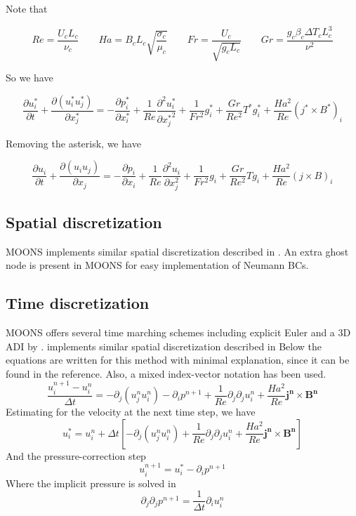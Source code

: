 \documentclass[11pt]{article}
\begin{document}
Note that

\begin{equation}
	Re = \frac{U_c L_c}{\nu_c} \qquad
	Ha = B_c L_c \sqrt{\frac{\sigma_c}{\mu_c}} \qquad
	Fr = \frac{U_c}{\sqrt{g_c L_c}} \qquad
	Gr = \frac{g_c \beta_c \Delta T_c L_c^3}{\nu^2}
\end{equation}

So we have

\begin{equation}
	\frac{\partial u_i^*}{\partial t} + 
	\frac{\partial (u_i^* u_j^*)}{\partial x_j^*}
	= 
	- \frac{\partial p_i^*}{\partial x_i^*}
	+ \frac{1}{Re}
	\frac{\partial^2 u_i^*}{\partial {x_j^*}^2}
	+ \frac{1}{Fr^2}
	g_i^*
	+ \frac{Gr}{Re^2}
	T^*g_i^*
	+ \frac{Ha^2}{Re}
	(j^* \times B^*)_i
\end{equation}

Removing the asterisk, we have

\begin{equation}
	\boxed{
	\frac{\partial u_i}{\partial t} + 
	\frac{\partial (u_i u_j)}{\partial x_j}
	= 
	- \frac{\partial p_i}{\partial x_i}
	+ \frac{1}{Re}
	\frac{\partial^2 u_i}{\partial x_j^2}
	+ \frac{1}{Fr^2}
	g_i
	+ \frac{Gr}{Re^2}
	T g_i
	+ \frac{Ha^2}{Re}
	(j \times B)_i
	}
\end{equation}


\subsection{Spatial discretization}
MOONS implements similar spatial discretization described in \cite{griebel1997numerical}. An extra ghost node is present in MOONS for easy implementation of Neumann BCs.

\subsection{Time discretization}
MOONS offers several time marching schemes including explicit Euler and a 3D ADI by . implements similar spatial discretization described in \cite{griebel1997numerical}
Below the equations are written for this method with minimal explanation, since it can be found in the reference. Also, a mixed index-vector notation has been used.
\begin{equation}
	\frac{u_i^{n+1}- u_i^{n}}{\Delta t} = - \partial_j (u_j^{n} u_i^{n}) 
	-\partial_i  p^{n+1} + 
	\frac{1}{Re} \partial_j \partial_j u_i^{n} + 
	\frac{Ha^2}{Re} \pmb{j^{n}} \times \pmb{B^{n}}
\end{equation}
Estimating for the velocity at the next time step, we have
\begin{equation}
	u_i^* = u_i^{n} + \Delta t \left[ - \partial_j (u_j^{n} u_i^{n}) + 
	\frac{1}{Re} \partial_j \partial_j u_i^{n} + 
	\frac{Ha^2}{Re} \pmb{j^{n}} \times \pmb{B^{n}} \right]
\end{equation}
And the pressure-correction step
\begin{equation}
	u_i^{n+1} = u_i^* -\partial_i p^{n+1}
\end{equation}
Where the implicit pressure is solved in
\begin{equation}
	\partial_j \partial_j p^{n+1} = \frac{1}{\Delta t} \partial_i u_i^n
\end{equation}




\end{document}
